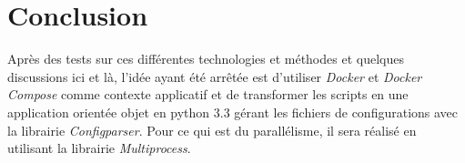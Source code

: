 \section{Conclusion}
Après des tests sur ces différentes technologies et méthodes et quelques discussions ici et là, l'idée ayant été arrêtée est d'utiliser \emph{Docker} et \emph{Docker Compose} comme contexte applicatif et de transformer les scripts en une application orientée objet en python 3.3 gérant les fichiers de configurations avec la librairie \emph{Configparser}. Pour ce qui est du parallélisme, il sera réalisé en utilisant la librairie \emph{Multiprocess}.
















